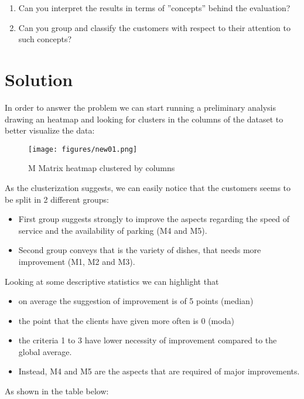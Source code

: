 \documentclass[10pt]{article}
\theoremstyle{plain}
\theoremstyle{definition}
\begin{document}
\begin{enumerate}

\item Can you interpret the results in terms of ”concepts” behind the evaluation? 
\item Can you group and classify the customers with respect to their attention to such concepts?

\end{enumerate}



\section{Solution}
In order to answer the problem we can start running a preliminary analysis drawing an heatmap and looking for clusters in the columns of the dataset to better visualize the data: 
\begin{figure}[H]
	\centering
	\texttt{[image: figures/new01.png]}
	\caption{M Matrix heatmap clustered by columns}
	\label{c1}
\end{figure}

As the clusterization suggests, we can easily notice that the customers seems to be split in 2 different groups:

\begin{itemize}

\item First group suggests strongly to improve the aspects regarding the speed of service and the availability of parking (M4 and M5).


\item Second group conveys that is the variety of dishes, that needs more improvement (M1, M2 and M3).

\end{itemize} 
Looking at some descriptive statistics we can highlight that
\begin{itemize}
    \item on average the suggestion of improvement is of 5 points (median) 
    \item the point that the clients have given more often is 0 (moda)
    \item the criteria 1 to 3 have lower necessity of improvement compared to the global average. 
    \item Instead, M4 and M5 are the aspects that are required of major improvements. 
\end{itemize}

As shown in the table below:
\newpage
\end{document}
